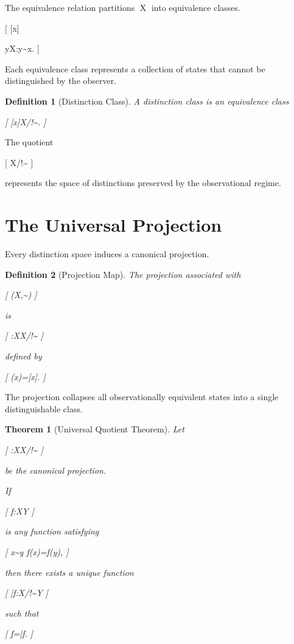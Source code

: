 \documentclass[11pt,oneside,openany]{book}
\newtheorem{definition}{Definition}[chapter] \newtheorem{theorem}{Theorem}[chapter] \newtheorem{proposition}{Proposition}[chapter] \newtheorem{lemma}{Lemma}[chapter] \newtheorem{corollary}{Corollary}[chapter] \newtheorem{remark}{Remark}[chapter]
\begin{document}
The equivalence relation partitions X into equivalence classes.

[
[x]

{y\in X:y\sim x}.
]

Each equivalence class represents a collection of states that cannot be distinguished by the observer.

\begin{definition}[Distinction Class]

A distinction class is an equivalence class

[
[x]\in X/!\sim.
]

\end{definition}

The quotient

[
X/!\sim
]

represents the space of distinctions preserved by the observational regime.

\section{The Universal Projection}

Every distinction space induces a canonical projection.

\begin{definition}[Projection Map]

The projection associated with

[
(X,\sim)
]

is

[
\pi:X\rightarrow X/!\sim
]

defined by

[
\pi(x)=[x].
]

\end{definition}

The projection collapses all observationally equivalent states into a single distinguishable class.

\begin{theorem}[Universal Quotient Theorem]

Let

[
\pi:X\rightarrow X/!\sim
]

be the canonical projection.

If

[
f:X\rightarrow Y
]

is any function satisfying

[
x\sim y
\quad\Rightarrow\quad
f(x)=f(y),
]

then there exists a unique function

[
\bar f:X/!\sim\rightarrow Y
]

such that

[
f=\bar f\circ \pi.
]

\end{theorem}
\end{document}
